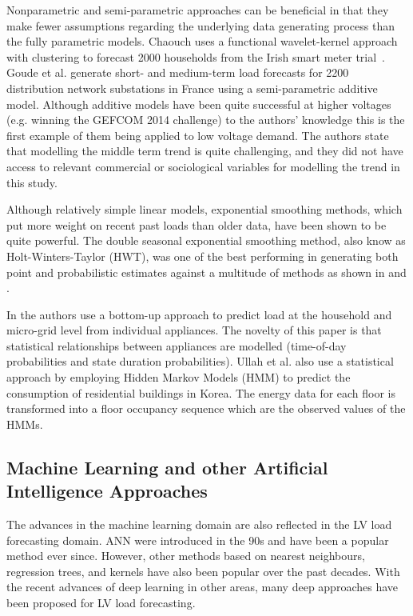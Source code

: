 Nonparametric and semi-parametric approaches can be beneficial in that they make fewer assumptions regarding the underlying data generating process than the fully parametric models. Chaouch \cite{Chaouch2014cio} uses a functional wavelet-kernel approach with clustering to forecast 2000 households from the Irish smart meter trial~\cite{Commission2012csm}. Goude et al. \cite{Goude2014lsa} generate short- and medium-term load forecasts for 2200 distribution network substations in France using a semi-parametric additive model. Although additive models have been quite successful at higher voltages (e.g. winning the GEFCOM 2014 challenge) to the authors' knowledge this is the first example of them being applied to low voltage demand. The authors state that modelling the middle term trend is quite challenging, and they did not have access to relevant commercial or sociological variables for modelling the trend in this study.

Although relatively simple linear models, exponential smoothing methods, which put more weight on recent past loads than older data, have been shown to be quite powerful. The double seasonal exponential smoothing method, also know as Holt-Winters-Taylor (HWT),  was one of the best performing in generating both point and probabilistic estimates against a multitude of methods as shown in \cite{Haben2019stl} and \cite{Arora2016fes}. 

In \cite{dinesh2020rpf} the authors use a bottom-up approach to predict load at the household and micro-grid level from individual appliances. The novelty of this paper is that statistical relationships between appliances are modelled (time-of-day probabilities and state duration probabilities). Ullah et al. \cite{ullah2018apm} also use a statistical approach by employing  Hidden Markov Models (HMM) to predict the consumption of residential buildings in Korea. The energy data for each floor is transformed into a floor occupancy sequence which are the observed values of the HMMs.


\subsection{Machine Learning and other Artificial Intelligence Approaches} %
\label{sec:machine-learning}

The advances in the machine learning domain are also reflected in the LV load forecasting domain. ANN were introduced in the 90s and have been a popular method ever since. However, other methods based on nearest neighbours, regression trees, and kernels have also been popular over the past decades. With the recent advances of deep learning in other areas, many deep approaches have been proposed for LV load forecasting. 

